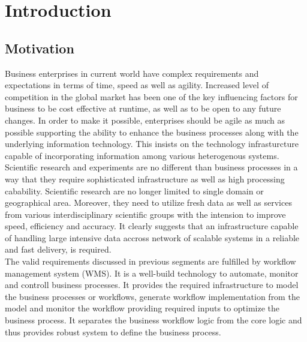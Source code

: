 \chapter{Introduction}\label{chapter:introduction}
\section{Motivation}\label{section:introduction/motivation}
Business enterprises in current world have complex requirements and expectations in terms of time, speed as well as agility. Increased level of competition in the global market has been one of the key influencing factors for business to be cost effective at runtime, as well as to be open to any future changes. In order to make it possible, enterprises should be agile as much as possible supporting the ability to enhance the business processes along with the underlying information technology.\cite{AMIT-SHETH:1995aa} This insists on the technology infrasturcture capable of incorporating information among various heterogenous systems. \cite{Alonso:2015aa}
\\

Scientific research and experiments are no different than business processes in a way that they require sophisticated infrastructure as well as high processing cabability. Scientific research are no longer limited to single domain or geographical area. Moreover, they need to utilize fresh data as well as services from various interdisciplinary scientific groups with the intension to improve speed, efficiency and accuracy. It clearly suggests that an infrastructure capable of handling large intensive data accross network of scalable systems in a reliable and fast delivery, is required.\cite{Ludascher:2005aa}
\\

The valid requirements discussed in previous segments are fulfilled by workflow management system (\acrshort{WMS}). It is a well-build technology to automate, monitor and controll business processes. It provides the required infrastructure to model the business processes or workflows, generate workflow implementation from the model and monitor the workflow providing required inputs to optimize the business process. It separates the business workflow logic from the core logic and thus provides robust system to define the business process.\cite{AMIT-SHETH:1995aa, Stoilova:2015aa}
\\

